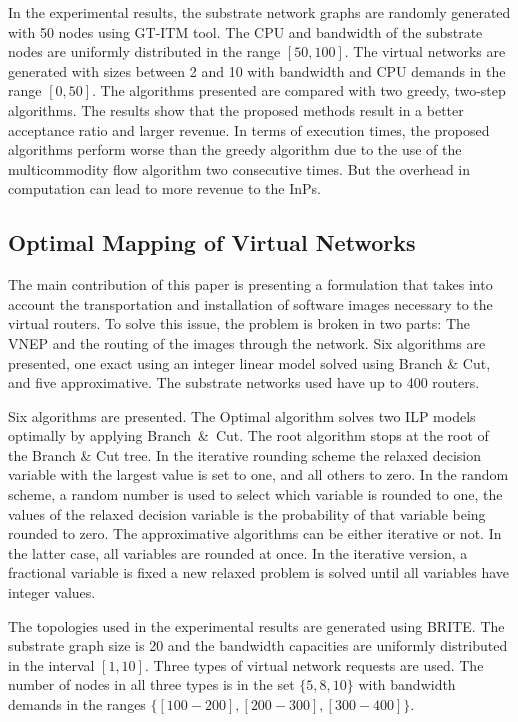 In the experimental results, the substrate network graphs are randomly generated with 50 nodes using GT-ITM tool. The CPU and bandwidth of the substrate nodes are uniformly distributed in the range $[50,100]$. The virtual networks are generated with sizes between 2 and 10 with bandwidth and CPU demands in the range $[0,50]$. The algorithms presented are compared with two greedy, two-step algorithms. The results show that the proposed methods result in a better acceptance ratio and larger revenue. In terms of execution times, the proposed algorithms perform worse than the greedy algorithm due to the use of the multicommodity flow algorithm two consecutive times. But the overhead in computation can lead to more revenue to the InPs.



\subsection{Optimal Mapping of Virtual Networks \cite{Alkmim2013}}
 The main contribution of this paper is presenting a formulation that takes into account the transportation and installation of software images necessary to the virtual routers. To solve this issue, the problem is broken in two parts: The VNEP and the routing of the images through the network. Six algorithms are presented, one exact using an integer linear model solved using Branch \& Cut, and five approximative. The substrate networks used have up to 400 routers.

Six algorithms are presented. The Optimal algorithm solves two ILP models optimally by applying Branch~\&~Cut. The root algorithm stops at the root of the Branch \& Cut tree. In the iterative rounding scheme the relaxed decision variable with the largest value is set to one, and all others to zero. In the random scheme, a random number is used to select which variable is rounded to one, the values of the relaxed decision variable is the probability of that variable being rounded to zero. The approximative algorithms can be either iterative or not. In the latter case, all variables are rounded at once. In the iterative version, a fractional variable is fixed a new relaxed problem is solved until all variables have integer values.

The topologies used in the experimental results are generated using BRITE\@. The substrate graph size is 20 and the bandwidth capacities are uniformly distributed in the interval $[1, 10]$. Three types of virtual network requests are used. The number of nodes in all three types is in the set $\{5, 8, 10\}$ with bandwidth demands in the ranges $\{[100-200], [200-300], [300-400]\}$.

